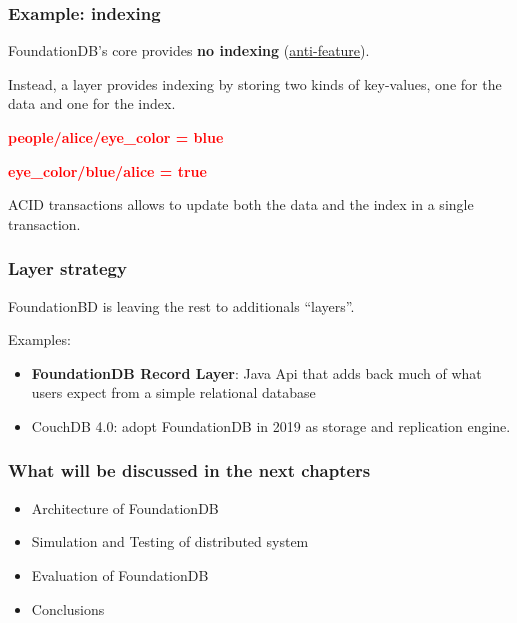 
\begin{frame}
	\frametitle{Example: indexing}

FoundationDB’s core provides \textbf{no indexing}  (\href{https://apple.github.io/foundationdb/anti-features.html}{anti-feature}).

Instead, a layer provides indexing by storing two kinds of key-values, one for the data and one for the index.

\begin{center}
\textbf{\textcolor{red}{people/alice/eye\_color = blue}}
\end{center}

\begin{center}
\textbf{\textcolor{red}{eye\_color/blue/alice = true}}
\end{center}

ACID transactions allows to update both the data and the index in a single transaction.
\end{frame}


\begin{frame}
	\frametitle{Layer strategy}

FoundationBD is leaving the rest to additionals “layers”.

\vspace{0.5cm}
Examples:
\begin{itemize}
    \item \textbf{FoundationDB Record Layer}: Java Api that adds back much of what users expect from a simple relational database 
    \item CouchDB 4.0: adopt FoundationDB in 2019 as storage and replication engine.
\end{itemize}
\end{frame}



\begin{frame}
	\frametitle{What will be discussed in the next chapters}

    \begin{itemize}
        \item Architecture of FoundationDB
        \item Simulation and Testing of distributed system
        \item Evaluation of FoundationDB
        \item Conclusions
    \end{itemize}
        
\end{frame}


